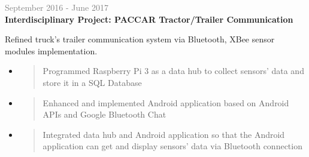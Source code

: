 \documentclass[letterpage]{article}
\begin{document}
\begin{minipage}[t]{0.61\linewidth}

\vspace{7px}
\textcolor{gray}{September 2016 - June 2017}
\quad 
\\
\textbf{\textsf{Interdisciplinary Project:
PACCAR Tractor/Trailer Communication}}\\
\raggedright
Refined truck’s trailer communication system via Bluetooth, XBee sensor modules implementation.\\
\begin{itemize}[leftmargin=*,labelindent=1mm,labelsep=0mm]
\item
  \begin{quote}
  \raggedright
  Programmed Raspberry Pi 3 as a data hub to collect sensors' data and store it in a SQL Database
  \end{quote}
\item
  \begin{quote}
  \raggedright
  Enhanced and implemented Android application based on Android APIs and Google Bluetooth Chat
  \end{quote}
\item
  \begin{quote}
  \raggedright
  Integrated data hub and Android application so that the Android application can get and display sensors' data via Bluetooth connection
  \end{quote}
\end{itemize}


\end{minipage}
\end{document}

